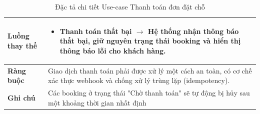 \begin{table}[H]
\begin{tabular}{|p{4cm}|p{10cm}|}
\textbf{Luồng thay thế} 
& 
\begin{itemize}
    \item Thanh toán thất bại  $\rightarrow$ Hệ thống nhận thông báo thất bại, giữ nguyên trạng thái booking và hiển thị thông báo lỗi cho khách hàng.
\end{itemize} \\ 
\hline

\textbf{Ràng buộc} 
& Giao dịch thanh toán phải được xử lý một cách an toàn, có cơ chế xác thực webhook và chống xử lý trùng lặp (idempotency). \\ 
\hline

\textbf{Ghi chú} 
& Các booking ở trạng thái "Chờ thanh toán" sẽ tự động bị hủy sau một khoảng thời gian nhất định\\ 
\hline
\end{tabular}
\caption{Đặc tả chi tiết Use-case Thanh toán đơn đặt chỗ}
\label{tab:payment-spec}
\end{table}


